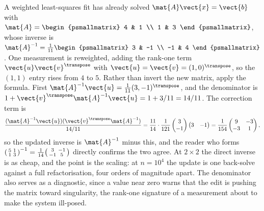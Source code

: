 \begin{example}
A weighted least-squares fit has already solved $\mat{A}\vect{x} =
\vect{b}$ with $\mat{A} = \begin{psmallmatrix} 4 & 1 \\ 1 & 3
\end{psmallmatrix}$, whose inverse is $\mat{A}^{-1} = \tfrac{1}{11}
\begin{psmallmatrix} 3 & -1 \\ -1 & 4 \end{psmallmatrix}$. One
measurement is reweighted, adding the rank-one term $\vect{u}
\vect{v}^{\transpose}$ with $\vect{u} = \vect{v} = (1, 0)^{\transpose}$,
so the $(1,1)$ entry rises from $4$ to $5$. Rather than invert the new
matrix, apply the formula. First $\mat{A}^{-1}\vect{u} = \tfrac{1}{11}
(3, -1)^{\transpose}$, and the denominator is $1 + \vect{v}^{\transpose}
\mat{A}^{-1}\vect{u} = 1 + 3/11 = 14/11$. The correction term is
\[
\frac{(\mat{A}^{-1}\vect{u})(\vect{v}^{\transpose}\mat{A}^{-1})}
{14/11} = \frac{11}{14}\cdot\frac{1}{121}
\begin{pmatrix} 3 \\ -1 \end{pmatrix}
\begin{pmatrix} 3 & -1 \end{pmatrix}
= \frac{1}{154}\begin{pmatrix} 9 & -3 \\ -3 & 1 \end{pmatrix},
\]
so the updated inverse is $\mat{A}^{-1}$ minus this, and the reader who
forms $\begin{psmallmatrix} 5 & 1 \\ 1 & 3 \end{psmallmatrix}^{-1} =
\tfrac{1}{14}\begin{psmallmatrix} 3 & -1 \\ -1 & 5 \end{psmallmatrix}$
directly confirms the two agree. At $2 \times 2$ the direct inverse is
as cheap, and the point is the scaling: at $n = 10^{4}$ the update is
one back-solve against a full refactorisation, four orders of magnitude
apart. The denominator also serves as a diagnostic, since a value near
zero warns that the edit is pushing the matrix toward singularity, the
rank-one signature of a measurement about to make the system
ill-posed.
\end{example}

